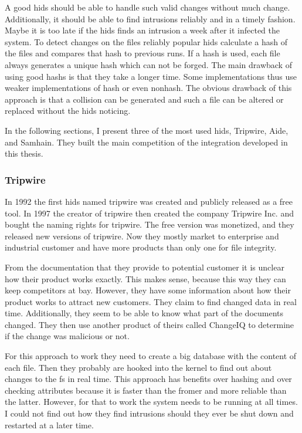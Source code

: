 A good \gls{hids} should be able to handle such valid changes without much change. Additionally, it should be able to find intrusions reliably and in a timely fashion. Maybe it is too late if the \gls{hids} finds an intrusion a week after it infected the system. To detect changes on the files reliably popular \gls{hids} calculate a hash of the files and compares that hash to previous runs. If a \gls{hash} is used, each file always generates a unique hash which can not be forged. The main drawback of using good \glspl{hash} is that they take a longer time. Some implementations thus use weaker implementations of \gls{hash} or even \gls{nonhash}. The obvious drawback of this approach is that a collision can be generated and such a file can be altered or replaced without the \gls{hids} noticing.

In the following sections, I present three of the most used \gls{hids}, Tripwire, Aide, and Samhain. They built the main competition of the integration developed in this thesis.

\subsubsection{Tripwire}
\label{sec:tripwire}

In 1992 the first \gls{hids} named tripwire was created and publicly released as a free tool. In 1997 the creator of tripwire then created the company Tripwire Inc. and bought the naming rights for tripwire. The free version was monetized, and they released new versions of tripwire. \cite{Tripwire:Impl, Tripwire:company} Now they mostly market to enterprise and industrial customer and have more products than only one for file integrity. \cite{tripwire}

From the documentation that they provide to potential customer it is unclear how their product works exactly. This makes sense, because this way they can keep competitors at bay. However, they have some information about how their product works to attract new customers. They claim to find changed data in real time. Additionally, they seem to be able to know what part of the documents changed. They then use another product of theirs called ChangeIQ to determine if the change was malicious or not. \cite{tripwire:fim:datasheet, tripwire:true:intent}

For this approach to work they need to create a big database with the content of each file. Then they probably are hooked into the kernel to find out about changes to the \gls{fs} in real time. This approach has benefits over hashing and over checking attributes because it is faster than the fromer and more reliable than the latter. However, for that to work the system needs to be running at all times. I could not find out how they find intrusions should they ever be shut down and restarted at a later time. 

